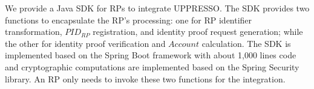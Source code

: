 


We provide a Java SDK for RPs to integrate UPPRESSO.
The SDK provides two functions to encapsulate the RP's processing: one for RP identifier transformation, $PID_{RP}$ registration, and identity proof request generation; while the other for identity proof verification and $Account$ calculation. %
The SDK is implemented based on the Spring Boot framework  with about 1,000 lines code and cryptographic computations are implemented based on the Spring Security library.
An RP only needs to invoke these two functions for the integration.


